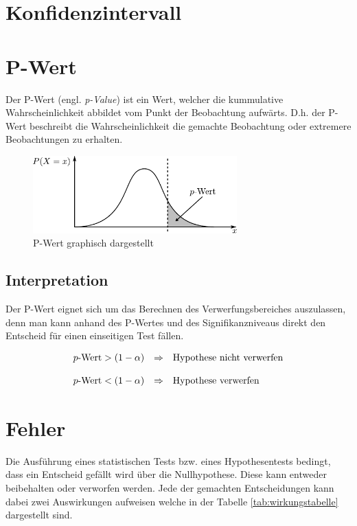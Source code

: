 \section{Konfidenzintervall}

\section{P-Wert}\label{sec:p-wert}
Der P-Wert (engl. \emph{p-Value}) ist ein Wert, welcher die kummulative 
Wahrscheinlichkeit abbildet vom Punkt der Beobachtung aufwärts. D.h.
der P-Wert beschreibt die Wahrscheinlichkeit die gemachte Beobachtung 
oder extremere Beobachtungen zu erhalten.

\begin{figure}[h!]
	\centering
	\includegraphics[width=0.7\textwidth]{p-value.pdf}
	\caption{P-Wert graphisch dargestellt}
	\label{fig:p-wert}
\end{figure}

\subsection{Interpretation}
Der P-Wert eignet sich um das Berechnen des Verwerfungsbereiches auszulassen,
denn man kann anhand des P-Wertes und des Signifikanzniveaus direkt den 
Entscheid für einen einseitigen Test fällen.

\[ 
	\begin{array}{c c l}
		p\text{-Wert} > (1-\alpha)
			& \Rightarrow
			& \text{Hypothese nicht verwerfen} \\
		& & \\
		p\text{-Wert} < (1-\alpha)
			& \Rightarrow
			& \text{Hypothese verwerfen}
	\end{array} 
\]

\section{Fehler}
Die Ausführung eines statistischen Tests bzw. eines Hypothesentests bedingt,
dass ein Entscheid gefällt wird über die Nullhypothese. Diese kann entweder
beibehalten oder verworfen werden. Jede der gemachten Entscheidungen kann dabei
zwei Auswirkungen aufweisen welche in der Tabelle \ref{tab:wirkungstabelle} 
dargestellt sind.

